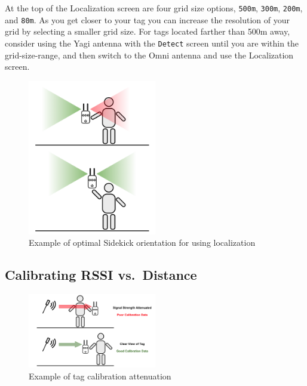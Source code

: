 \documentclass[
]{article}
\begin{document}
At the top of the Localization screen are four grid size options,
\texttt{500m}, \texttt{300m}, \texttt{200m}, and \texttt{80m}. As you
get closer to your tag you can increase the resolution of your grid by
selecting a smaller grid size. For tags located farther than 500m away,
consider using the Yagi antenna with the \texttt{Detect} screen until
you are within the grid-size-range, and then switch to the Omni antenna
and use the Localization screen.

\begin{figure}
\hypertarget{id}{%
\centering
\includegraphics[width=0.5\textwidth,height=\textheight]{./images/localization_orientation.png}
\caption{Example of optimal Sidekick orientation for using
localization}\label{id}
}
\end{figure}

\hypertarget{calibrating-rssi-vs.-distance}{%
\subsection{Calibrating RSSI
vs.~Distance}\label{calibrating-rssi-vs.-distance}}

\begin{figure}
\hypertarget{id}{%
\centering
\includegraphics[width=0.5\textwidth,height=\textheight]{./images/calibration_atten_diagram.png}
\caption{Example of tag calibration attenuation}\label{id}
}
\end{figure}
\end{document}
